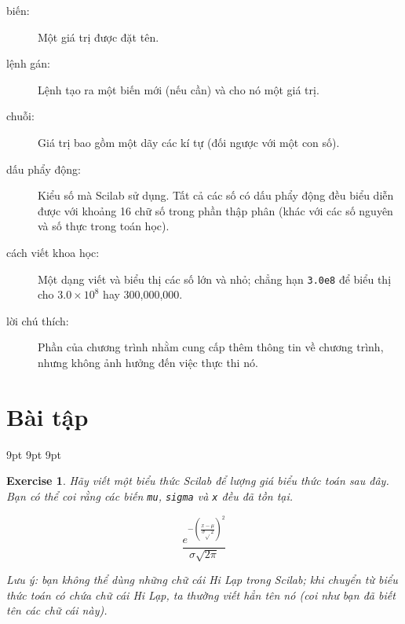 \documentclass[12pt]{book}
\begin{document}
\begin{description}
\item[biến:] Một giá trị được đặt tên.   

\item[lệnh gán:] Lệnh tạo ra một biến mới (nếu cần) và cho nó một
giá trị.

\item[chuỗi:] Giá trị bao gồm một dãy các kí tự (đối ngược với một con số).

\item[dấu phẩy động:] Kiểu số mà Scilab sử dụng. Tất cả các số có
dấu phẩy động đều biểu diễn được với khoảng 16 chữ số trong phần 
thập phân (khác với các số nguyên và số thực trong toán học).

\item[cách viết khoa học:] Một dạng viết và biểu thị các số lớn và nhỏ;
chẳng hạn {\tt 3.0e8} để biểu thị cho $3.0 \times 10^8$
hay 300,000,000.  

\item[lời chú thích:] Phần của chương trình nhằm cung cấp thêm thông tin
về chương trình, nhưng không ảnh hưởng đến việc thực thi nó.

\end{description}


\section{Bài tập}

     {9pt}%
     {9pt}%
     {\itshape}%
     {}%
     {\bfseries}%
     {}%
     {9pt}%
     {}%


\theoremstyle{myex}
\newtheorem{ex}{Exercise}[chapter]

\begin{ex}
Hãy viết một biểu thức Scilab để lượng giá biểu thức toán sau đây.
Bạn có thể coi rằng các biến {\tt mu}, {\tt sigma} và {\tt x} đều đã tồn tại.

\begin{equation}
\frac{e^{- \left( \frac{x-\mu}{\sigma \sqrt{}2} \right) ^2}}
{\sigma \sqrt{2 \pi}}
\end{equation}

Lưu ý: bạn không thể dùng những chữ cái Hi Lạp trong Scilab; khi
chuyển từ biểu thức toán có chứa chữ cái Hi Lạp, ta thường viết hẳn 
tên nó (coi như bạn đã biết tên các chữ cái này).
\end{ex}
 
\end{document}
